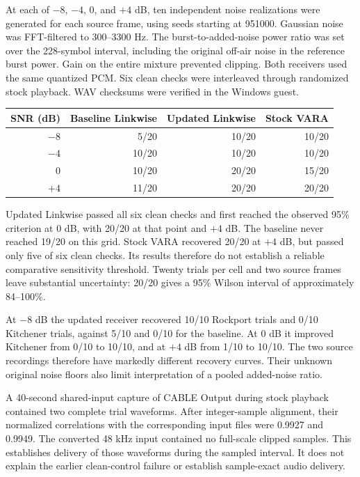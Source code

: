 \documentclass[11pt,a4paper]{article}
\begin{document}
At each of $-8$, $-4$, $0$, and $+4$ dB, ten independent noise
realizations were generated for each source frame, using seeds
starting at 951000. Gaussian noise was FFT-filtered to 300--3300 Hz.
The burst-to-added-noise power ratio was set over the 228-symbol
interval, including the original off-air noise in the reference
burst power. Gain on the entire mixture prevented clipping.
Both receivers used the same quantized PCM. Six clean checks were
interleaved through randomized stock playback. WAV checksums were
verified in the Windows guest.

\begin{center}
\begin{tabular}{@{}rrrr@{}}
\toprule
SNR (dB) & Baseline Linkwise & Updated Linkwise & Stock VARA \\
\midrule
$-8$ & 5/20 & 10/20 & 10/20 \\
$-4$ & 10/20 & 10/20 & 10/20 \\
$0$ & 10/20 & 20/20 & 15/20 \\
$+4$ & 11/20 & 20/20 & 20/20 \\
\bottomrule
\end{tabular}
\end{center}


Updated Linkwise passed all six clean checks and first reached the
observed 95\% criterion at $0$ dB, with 20/20 at that point and
$+4$ dB. The baseline never reached 19/20 on this grid.
Stock VARA recovered 20/20 at $+4$ dB, but passed only five of six
clean checks. Its results therefore do not establish a reliable
comparative sensitivity threshold. Twenty trials per cell and two
source frames leave substantial uncertainty: 20/20 gives a 95\%
Wilson interval of approximately 84--100\%.

At $-8$ dB the updated receiver recovered 10/10 Rockport trials and
0/10 Kitchener trials, against 5/10 and 0/10 for the baseline.
At $0$ dB it improved Kitchener from 0/10 to 10/10, and at $+4$ dB
from 1/10 to 10/10. The two source recordings therefore have markedly
different recovery curves. Their unknown original noise floors also
limit interpretation of a pooled added-noise ratio.

A 40-second shared-input capture of CABLE Output during stock playback
contained two complete trial waveforms. After integer-sample alignment,
their normalized correlations with the corresponding input files were
0.9927 and 0.9949. The converted 48 kHz input contained no full-scale
clipped samples. This establishes delivery of those waveforms during
the sampled interval. It does not explain the earlier clean-control
failure or establish sample-exact audio delivery.
\end{document}
